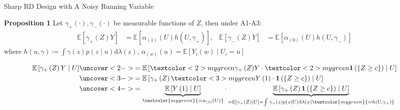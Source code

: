 \begin{frame}{Sharp RD Design with A Noisy Running Variable}
    \begin{block}{\textbf{Proposition 1}}
        \small
        Let $\gamma_{+}(\cdot),\gamma_{-}(\cdot)$ be measurable functions of $Z$, then under A1-A3:
        \begin{align*}
            \mathbb{E}\left[\gamma_{+}\left(Z\right)Y\right]&=\mathbb{E}\left[\alpha_{\left(1\right)}\left(U\right)h\left(U,\gamma_{+}\right)\right], & \mathbb{E}\left[\gamma_{-}\left(Z\right)Y\right]&=\mathbb{E}\left[\alpha_{\left(0\right)}\left(U\right)h\left(U,\gamma_{-}\right)\right]
        \end{align*}
        where $h\left(u,\gamma\right)\coloneqq\int\gamma\left(z\right)p\left(z\mid u\right)\mathrm{d}\lambda\left(z\right)$, $\alpha_{\left(w\right)}\left(u\right)=\mathbb{E}\left[Y_{i}\left(w\right)\mid U_{i}=u\right]$
    \end{block}
    \begin{align*}
        \mathbb{E}\left[\gamma_{+}\left(Z\right)Y\mid U\right] & \uncover<2->{= \mathbb{E}\left[ \textcolor<2>{mygreen}{\gamma_{+}\left(Z\right)} Y\cdot \textcolor<2>{mygreen}{\mathbf{1}\left(\left\{ Z\geq c\right\} \right)} \mid U\right]}\\
        & \uncover<3->{= \mathbb{E}\left[\gamma_{+}\left(Z\right) \textcolor<3>{mygreen}{Y\left(1\right)} \cdot\mathbf{1}\left(\left\{ Z\geq c\right\} \right)\mid U\right]}\\
        & \uncover<4->{ = \underbrace{\mathbb{E}\left[Y\left(1\right)\mid U\right]}_{\textcolor{mygreen}{=\alpha_{\left(1\right)}\left(U\right)}}\cdot\underbrace{\mathbb{E}\left[\gamma_{+}\left(Z\right)\mathbf{1}\left(\left\{ Z\geq c\right\} \right)\mid U\right]}_{=\mathbb{E}\left[\gamma_{+}\left(Z\right)\mid U\right] = \int\gamma_{+}\left(z\right)p\left(z\mid U\right)\mathrm{d}\lambda\left(z\right) \textcolor{mygreen}{= h(U,\gamma_+)} } }
    \end{align*} 
    
\end{frame}

